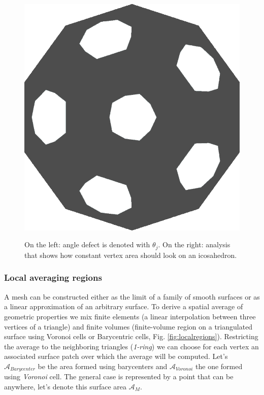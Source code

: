 \begin{figure}[!h]
    \includegraphics[scale=0.13]{images/gaussian-ball.png}
    \label{fig:gc-icosahedron}
    \endminipage
    \caption{On the left: angle defect is denoted with $\theta_j$. On the right: analysis that shows how constant vertex area should look on an icosahedron.}
\end{figure}

\subsubsection{Local averaging regions} \label{section:localaveraging}
A mesh can be constructed either as the limit of a family of smooth surfaces or as a linear approximation of an arbitrary surface. To derive a spatial average of geometric properties we mix finite elements (a linear interpolation between three vertices of a triangle) and finite volumes (finite-volume region on a triangulated surface using Voronoi cells or Barycentric cells, Fig. \ref{fig:localregions}). Restricting the average to the neighboring triangles (\textit{1-ring}) we can choose for each vertex an associated surface patch over which the average will be computed.
Let's $\mathcal{A}_{Barycenter}$ be the area formed using barycenters and $\mathcal{A}_{Voronoi}$ the one formed using \textit{Voronoi} cell. The general case is represented by a point that can be anywhere, let's denote this surface area $\mathcal{A}_M$.


